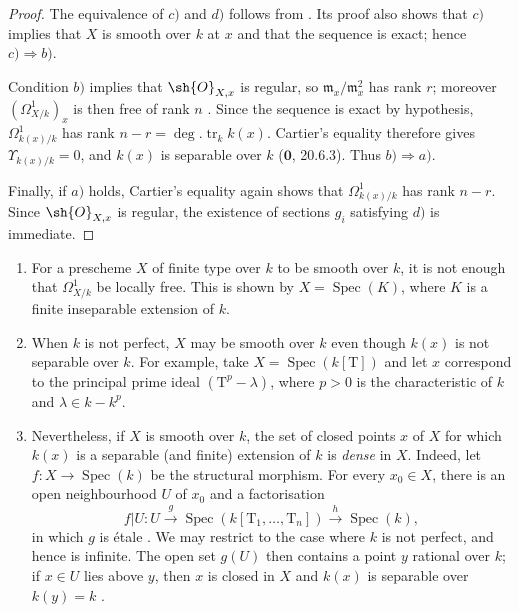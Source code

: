 \begin{proof}
The equivalence of $c)$ and $d)$ follows from .  Its proof also shows that $c)$ implies that $X$ is smooth over $k$ at $x$ and that the sequence  is exact; hence $c)\Rightarrow b)$.

Condition $b)$ implies that $\sh{O}_{X,x}$ is regular, so $\mathfrak m_x/\mathfrak m_x^2$ has rank $r$; moreover $(\Omega^1_{X/k})_x$ is then free of rank $n$ .  Since the sequence  is exact by hypothesis, $\Omega^1_{k(x)/k}$ has rank $n-r=\deg.\operatorname{tr}_k k(x)$.  Cartier's equality therefore gives $\Upsilon_{k(x)/k}=0$, and $k(x)$ is separable over $k$ ($\mathbf{0}$, 20.6.3).  Thus $b)\Rightarrow a)$.

Finally, if $a)$
holds, Cartier's equality again shows that $\Omega^1_{k(x)/k}$ has rank $n-r$.  Since $\sh{O}_{X,x}$ is regular, the existence of sections $g_i$ satisfying $d)$ is immediate.
\end{proof}

\begin{remarks}[17.15.10]
\label{IV.17.15.10}
\begin{enumerate}[label=(\roman*)]
  \item For a prescheme $X$ of finite type over $k$ to be smooth over $k$, it is not enough that $\Omega^1_{X/k}$ be locally free.  This is shown by $X=\operatorname{Spec}(K)$, where $K$ is a finite inseparable extension of $k$.
  \item When $k$ is not perfect, $X$ may be smooth over $k$ even though $k(x)$ is not separable over $k$.  For example, take $X=\operatorname{Spec}(k[\mathrm{T}])$ and let $x$ correspond to the principal prime ideal $(\mathrm{T}^p-\lambda)$, where $p>0$ is the characteristic of $k$ and $\lambda\in k-k^p$.
  \item Nevertheless, if $X$ is smooth over $k$, the set of closed points $x$ of $X$ for which $k(x)$ is a separable (and finite) extension of $k$ is \emph{dense} in $X$.  Indeed, let $f:X\to\operatorname{Spec}(k)$ be the structural morphism.  For every $x_0\in X$, there is an open neighbourhood $U$ of $x_0$ and a factorisation
  \[
   f|U:U\xrightarrow{g}\operatorname{Spec}(k[\mathrm{T}_1,\ldots,\mathrm{T}_n])\xrightarrow{h}\operatorname{Spec}(k),
  \]
  in which $g$ is \'etale .  We may restrict to the case where $k$ is not perfect, and hence is infinite.  The open set $g(U)$ then contains a point $y$ rational over $k$; if $x\in U$ lies above $y$, then $x$ is closed in $X$ and $k(x)$ is separable over $k(y)=k$ .
\end{enumerate}
\end{remarks}

